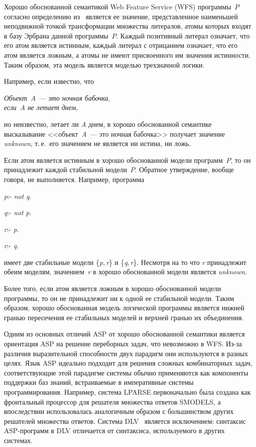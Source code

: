 \begin{multicols}{2}
Хорошо обоснованной семантикой Web Feature Service (WFS) программы~$P$ согласно определению 
из~\cite{26kal} является ее значение, представленное наименьшей неподвижной точкой 
трансформации множества литералов, атомы которых входят в базу Эрбрана данной 
программы~$P$. Каждый позитивный литерал означает, что его атом является истинным, 
каждый литерал с отрицанием означает, что его атом является ложным, а атомы не имеют 
присвоенного им значения истинности. Таким образом, эта модель является моделью 
трехзначной логики.

Например, если известно, что

\begin{center}
\textit{Объект~A}~--- \textit{ это ночная бабочка},\\
\textit{если~A не летает днем},
\end{center}

\noindent
но неизвестно, летает ли \textit{A} днем, в хорошо обоснованной семантике высказывание 
<<объект~\textit{A}~--- это ночная бабочка>> получает значение \textit{unknown}, т.\,е.\ его 
значением не является ни истина, ни ложь.

Если атом является истинным в хорошо обосно\-ван\-ной модели программ~$P$, то он 
принадлежит каждой стабильной модели~$P$. Обратное утверждение, вообще говоря, не 
выполняется. Например, программа

\smallskip

\textit{p}:\;- \textit{not q}.

\textit{q}:\;-  \textit{not p}.

\textit{r}:\;-  \textit{p.}

\textit{r}:\;-  \textit{q.}

\smallskip

\noindent
имеет две стабильные модели \{\textit{p},\,\textit{r}\} и \{\textit{q},\,\textit{r}\}. 
Несмотря на то что \textit{r} принадлежит 
обеим моделям, значением~\textit{r} в хорошо обоснованной модели является \textit{unknown}.

Более того, если атом является ложным в хорошо обоснованной модели программы, то он не 
принадлежит ни к одной ее стабильной модели. Таким образом, хорошо обоснованная 
модель логической программы является нижней гранью пересечения ее стабильных 
моделей и верхней гранью их объединения.

Одним из основных отличий ASP от хорошо обосно\-ван\-ной семантики является ориентация 
ASP на решение переборных задач, что невозможно в WFS. Из-за различия выразительной 
способности двух парадигм они используются в разных целях. Язык ASP идеально подходит для 
решения сложных комбинаторных задач, соответствующие этой парадигме системы обычно 
применяются как компоненты поддержки баз знаний, встраиваемые в императивные 
системы программирования. Например, система LPARSE первоначально была создана как 
фронтальный процессор для решателя множества ответов SMODELS, а впоследствии 
использовалась аналогичным образом с большинством других решателей множества 
ответов. Система DLV~\cite{33kal} является исключением: синтаксис ASP-программ в DLV 
отличается от синтаксиса, используемого в других системах.


\end{multicols}
